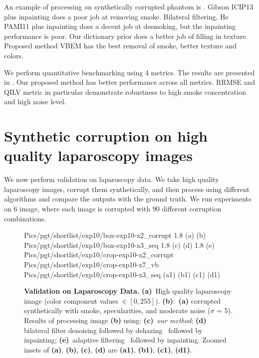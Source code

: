 An example of processing on synthetically corrupted phantom is . Gibson ICIP13 \cite{gibson2013wiener} plus inpainting does a poor job at removing smoke. Bilateral filtering, He PAMI11 \cite{he2011dark} plus inpainting does a decent job at desmoking, but the inpainting performance is poor. Our dictionary prior does a better job of filling in texture. Proposed method VBEM has the best removal of smoke, better texture and colors.

We perform quantitative benchmarking using 4 metrics. The results are presented in . Our proposed method has better performance across all metrics. RRMSE and QILV metric in particular demonstrate robustness to high smoke concentration and high noise level.

\section{Synthetic corruption on high quality laparoscopy images}
We now perform validation on laparoscopy data. We take high quality laparoscopy images, corrupt them synthetically, and then process using different algorithms and compare the outputs with the ground truth. We run experiments on 6 image, where each image is corrupted with 90 different corruption combinations.

\begin{figure}[!h]
     {Pics/pgt/shortlist/exp10/box-exp10-x2_corrupt} {1.8} {(a)} {(b)}
     {Pics/pgt/shortlist/exp10/box-exp10-x3_seq} {1.8} {(c)} {(d)}
     {1.8} {(e)}
     {Pics/pgt/shortlist/exp10/crop-exp10-x2_corrupt} {Pics/pgt/shortlist/exp10/crop-exp10-x7_vb} {Pics/pgt/shortlist/exp10/crop-exp10-x3_seq}  {(a1)} {(b1)} {(c1)} {(d1)}
    \caption
    {
        {\bf Validation on Laparoscopy Data. }
        {\bf (a)}~High quality laparoscopy image (color component values $\in [0,255]$).
        {\bf (b)}:~{\bf (a)} corrupted synthetically with smoke, specularities, and moderate noise ($\sigma$ = 5).
        Results of processing image {\bf (b)} using:
        {\bf (c)}~{\em our method};
        {\bf (d)}~ bilateral filter denoising followed by dehazing~\cite{he2011dark} followed by inpainting;
        {\bf (e)}~adaptive filtering~\cite{gibson2013wiener} followed by inpainting.
        Zoomed insets of {\bf (a)}, {\bf (b)}, {\bf (c)}, {\bf (d)} are {\bf (a1)}, {\bf (b1)}, {\bf (c1)}, {\bf (d1)}.
    }
    \label{fig:imagesPgt1}
\end{figure}

